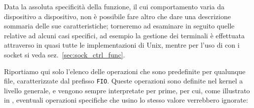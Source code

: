 Data la assoluta specificità della funzione, il cui comportamento varia da
dispositivo a dispositivo, non è possibile fare altro che dare una descrizione
sommaria delle sue caratteristiche; torneremo ad esaminare in seguito quelle
relative ad alcuni casi specifici, ad esempio la gestione dei terminali è
effettuata attraverso  in quasi tutte le implementazioni di Unix,
mentre per l'uso di  con i socket si veda
sez.~\ref{sec:sock_ctrl_func}. 

Riportiamo qui solo l'elenco delle operazioni che sono predefinite per
qualunque file, caratterizzate dal prefisso \texttt{FIO}. Queste operazioni
sono definite nel kernel a livello generale, e vengono sempre interpretate per
prime, per cui, come illustrato in \cite{LinDevDri}, eventuali operazioni
specifiche che usino lo stesso valore verrebbero ignorate:

